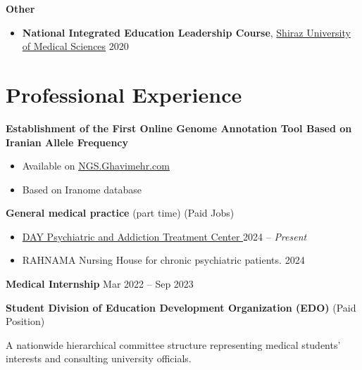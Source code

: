 \documentclass[letterpaper,11pt]{article} %
\begin{document}
\textbf{Other}
\vspace{-0.5\baselineskip} 
\begin{itemize}
\item \textbf{National Integrated Education Leadership Course}, \footnotesize \href{https://gsia.sums.ac.ir/}{Shiraz University of Medical Sciences} \hfill 2020 \normalsize
\end{itemize}


\section{Professional Experience}
\textbf{Establishment of the First Online Genome Annotation Tool Based on Iranian Allele Frequency}
\vspace{-0.5\baselineskip}
\begin{itemize}
 \item Available on \href{http://ngs.ghavimehr.com/}{NGS.Ghavimehr.com \faExternalLink*}
 \item Based on Iranome database
\end{itemize}

\textbf{General medical practice} (part time) \hfill \footnotesize (Paid Jobs) \normalsize
\vspace{-0.5\baselineskip}
	\begin{itemize}
	 \item \href{https://www.day-clinic.ir/}{DAY Psychiatric and Addiction Treatment Center \faExternalLink*} \hfill \footnotesize{2024 -- \textit{Present}} \normalsize
	 \item RAHNAMA Nursing House for chronic psychiatric patients.  \hfill \footnotesize{2024} \normalsize
	\end{itemize}

\textbf{Medical Internship} \hfill \footnotesize{Mar 2022 -- Sep 2023} \normalsize

\textbf{Student Division of Education Development Organization (EDO)} \hfill  \footnotesize (Paid Position) \normalsize
\vspace{-0.5\baselineskip}
\begin{adjustwidth}{0.5cm}{2cm}
A nationwide hierarchical committee structure representing medical students' interests and consulting university of\nolinebreak ficials.
\end{adjustwidth}
\end{document}
